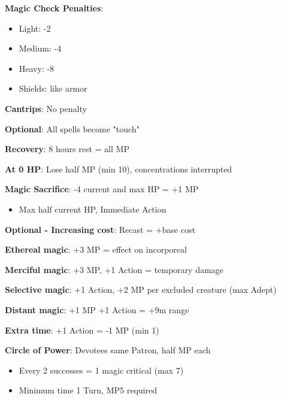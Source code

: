 \documentclass[10pt,a4paper,landscape]{article}
\begin{document}
\begin{multicols}{3}
		\begin{tcolorbox}[title=ARMOR AND MAGIC]
			\textbf{Magic Check Penalties}:
			\begin{itemize}[leftmargin=*,noitemsep]
				\item Light: -2
				\item Medium: -4  
				\item Heavy: -8
				\item Shields: like armor
			\end{itemize}
			
			\textbf{Cantrips}: No penalty
			
			\textbf{Optional}: All spells become "touch"
		\end{tcolorbox}
		
		\begin{tcolorbox}[title=MAGIC POINTS MANAGEMENT]
			\textbf{Recovery}: 8 hours rest = all MP
			
			\textbf{At 0 HP}: Lose half MP (min 10), concentrations interrupted
			
			\textbf{Magic Sacrifice}: -4 current and max HP = +1 MP
			\begin{itemize}[leftmargin=*,noitemsep]
				\item Max half current HP, Immediate Action
			\end{itemize}
			
			\textbf{Optional - Increasing cost}: Recast = +base cost
		\end{tcolorbox}
		
		\begin{tcolorbox}[title=MAGIC ALTERATIONS]
			\textbf{Ethereal magic}: +3 MP = effect on incorporeal
			
			\textbf{Merciful magic}: +3 MP, +1 Action = temporary damage
			
			\textbf{Selective magic}: +1 Action, +2 MP per excluded creature (max Adept)
			
			\textbf{Distant magic}: +1 MP +1 Action = +9m range
			
			\textbf{Extra time}: +1 Action = -1 MP (min 1)
			
			\textbf{Circle of Power}: Devotees same Patron, half MP each
			\begin{itemize}[leftmargin=*,noitemsep]
				\item Every 2 successes = 1 magic critical (max 7)
				\item Minimum time 1 Turn, MP5 required
			\end{itemize}
		\end{tcolorbox}
		

\end{multicols}
\end{document}
